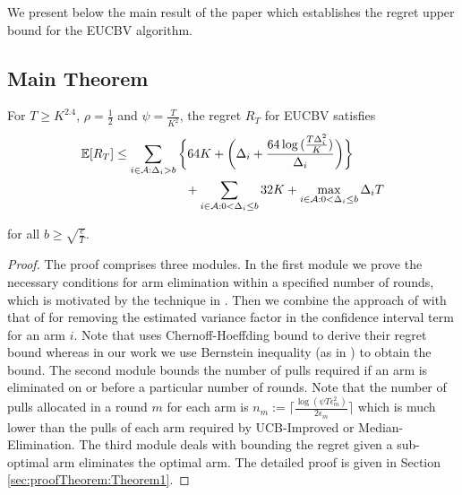 

We present below the main result of the paper which establishes the regret upper bound for the EUCBV  algorithm. 
\subsection*{Main Theorem}
\begin{theorem}
\label{Result:Theorem:1}
For $T\geq K^{2.4}$, $\rho=\frac{1}{2}$ and $\psi=\frac{T}{K^2}$, the regret $R_T$ for EUCBV satisfies
\begin{align*}
\E [R_{T}] & \leq \sum\limits_{i\in \A :\Delta_{i} > b}\bigg\lbrace 64 K + \bigg(\Delta_{i}+\dfrac{64\log{(\frac{T\Delta_{i}^{2}}{K})}}{\Delta_{i}}\bigg)\bigg \rbrace \\
 & \hspace{20mm}+\sum\limits_{i\in \A :0 < \Delta_{i}\leq b} 32 K + \max_{i\in \A :0 < \Delta_{i}\leq b}\Delta_{i}T  
\end{align*}

for all $b\geq\sqrt{\frac{e}{T}}$. 
\end{theorem}

\begin{proof}
The proof comprises three modules. In the first module we prove the necessary conditions for arm elimination within a specified number of rounds, which is motivated by the technique in \cite{auer2010ucb}. 
Then we combine the approach of \cite{audibert2009exploration} with that of  \cite{auer2010ucb} for removing the estimated variance factor in the confidence interval term for an arm $i$. Note that  \cite{auer2010ucb} uses Chernoff-Hoeffding bound to derive their regret bound whereas in our work we use  Bernstein inequality (as in \cite{audibert2009exploration}) to obtain the bound. The second module bounds the number of pulls required if an arm is eliminated on or before a particular number of rounds. Note that the number of pulls allocated in a round $m$ for each arm is $n_{m}:=\bigg\lceil\frac{\log{(\psi T\epsilon_{m}^{2})}}{2\epsilon_{m}}\bigg\rceil$ which is much lower than the pulls of each arm required by UCB-Improved or Median-Elimination. The third module deals with bounding the regret given a sub-optimal arm eliminates the optimal arm. The detailed proof is given in Section \ref{sec:proofTheorem:Theorem1}.
\end{proof}

